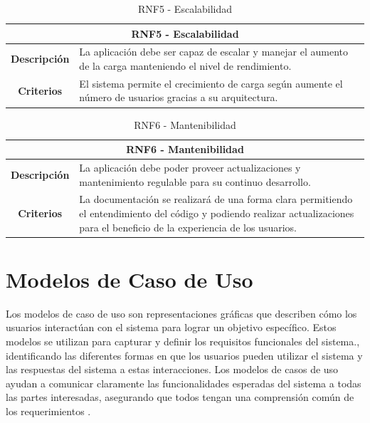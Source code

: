 \begin{table}[H]
    \centering
    \begin{tabular}{|c|p{10cm}|}
        \hline
        \multicolumn{2}{|c|}{\textbf{RNF5 - Escalabilidad}}                                                                                  \\
        \hline
        \textbf{Descripción} & La aplicación debe ser capaz de escalar y manejar el aumento de la carga manteniendo el nivel de rendimiento. \\
        \hline
        \textbf{Criterios}   & El sistema permite el crecimiento de carga según aumente el número de usuarios gracias a su arquitectura.     \\
        \hline
    \end{tabular}
    \caption{RNF5 - Escalabilidad}
\end{table}

\begin{table}[H]
    \centering
    \begin{tabular}{|c|p{10cm}|}
        \hline
        \multicolumn{2}{|c|}{\textbf{RNF6 - Mantenibilidad}}                                                                                                                                                     \\
        \hline
        \textbf{Descripción} & La aplicación debe poder proveer actualizaciones y mantenimiento regulable para su continuo desarrollo.                                                                           \\
        \hline
        \textbf{Criterios}   & La documentación se realizará de una forma clara permitiendo el entendimiento del código y podiendo realizar actualizaciones para el beneficio de la experiencia de los usuarios. \\
        \hline
    \end{tabular}
    \caption{RNF6 - Mantenibilidad}
\end{table}

\section{Modelos de Caso de Uso}

Los modelos de caso de uso son representaciones gráficas que describen cómo los usuarios interactúan con el sistema para lograr un objetivo específico. Estos modelos se utilizan para capturar y definir los requisitos funcionales del sistema., identificando las diferentes formas en que los usuarios pueden utilizar el sistema y las respuestas del sistema a estas interacciones. Los modelos de casos de uso ayudan a comunicar claramente las funcionalidades esperadas del sistema a todas las partes interesadas, asegurando que todos tengan una comprensión común de los requerimientos \cite{ibm}. 

